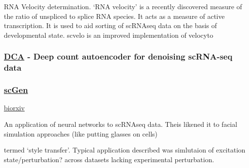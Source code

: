 \documentclass[]{article}
\begin{document}
RNA Velocity determination. `RNA velocity' is a recently discovered
measure of the ratio of unspliced to splice RNA species. It acts as a
measure of active transcription. It is used to aid sorting of scRNAseq
data on the basis of developmental state. scvelo is an improved
implementation of velocyto

\hypertarget{dca---deep-count-autoencoder-for-denoising-scrna-seq-data}{%
\subsubsection{\texorpdfstring{\href{https://github.com/theislab/dca}{DCA}
- Deep count autoencoder for denoising scRNA-seq
data}{DCA - Deep count autoencoder for denoising scRNA-seq data}}\label{dca---deep-count-autoencoder-for-denoising-scrna-seq-data}}

\hypertarget{scgen}{%
\subsubsection{\texorpdfstring{\href{https://github.com/theislab/scGen}{scGen}}{scGen}}\label{scgen}}

\href{https://www.biorxiv.org/content/early/2018/12/14/478503}{biorxiv}

An application of neural networks to scRNAseq data. Theis likened it to
facial simulation approaches (like putting glasses on cells)

termed `style transfer'. Typical application described was simlutaion of
excitation state/perturbation? across datasets lacking experimental
perturbation.
\end{document}
